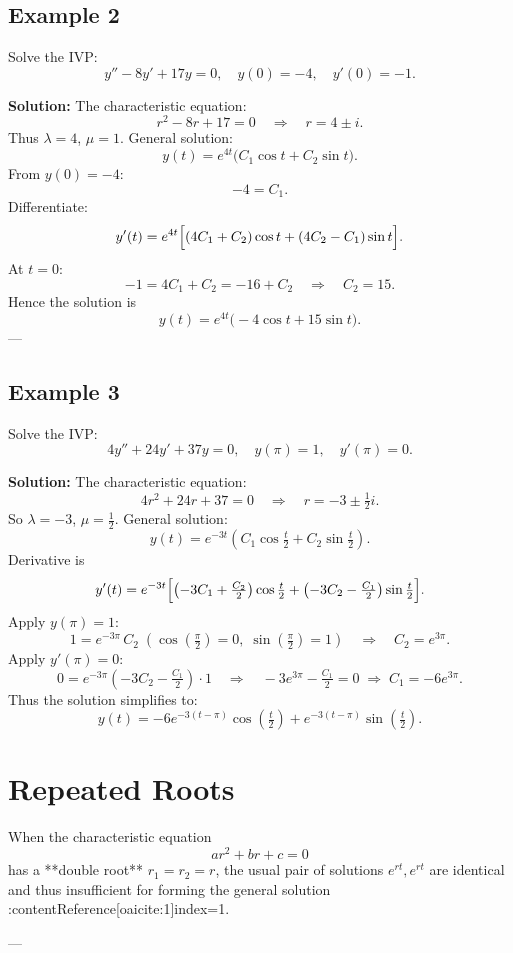 \documentclass[12pt]{book}
\begin{document}
\subsection*{Example 2}
Solve the IVP:
\[
y'' - 8y' + 17y = 0, \quad y(0) = -4, \quad y'(0) = -1.
\]

\textbf{Solution:}
The characteristic equation:
\[
r^2 - 8r + 17 = 0 \quad \Rightarrow \quad r = 4 \pm i.
\]
Thus \(\lambda=4\), \(\mu=1\). General solution:
\[
y(t) = e^{4t} \bigl(C_1 \cos t + C_2 \sin t\bigr).
\]
From \(y(0)=-4\):
\[
-4 = C_1.
\]
Differentiate:
\[
y'(t) = e^{4t} \Bigl[(4C_1 + C_2)\cos t + (4C_2 - C_1)\sin t\Bigr].
\]
At \(t=0\):
\[
-1 = 4C_1 + C_2 = -16 + C_2 \quad \Rightarrow \quad C_2 = 15.
\]
Hence the solution is
\[
\boxed{y(t) = e^{4t}\bigl(-4\cos t + 15\sin t\bigr)}.
\]
---

\subsection*{Example 3}
Solve the IVP:
\[
4y'' + 24y' + 37y = 0,\quad y(\pi) = 1,\quad y'(\pi) = 0.
\]

\textbf{Solution:}
The characteristic equation:
\[
4r^2 + 24r + 37 = 0 \quad \Rightarrow \quad r = -3 \pm \tfrac{1}{2}i.
\]
So \(\lambda = -3\), \(\mu = \frac{1}{2}\). General solution:
\[
y(t) = e^{-3t}(C_1 \cos\tfrac{t}{2} + C_2 \sin\tfrac{t}{2}).
\]
Derivative is
\[
y'(t) = e^{-3t}\Bigl[\bigl(-3C_1 + \tfrac{C_2}{2}\bigr)\cos\tfrac{t}{2} + \bigl(-3C_2 - \tfrac{C_1}{2}\bigr)\sin\tfrac{t}{2}\Bigr].
\]
Apply \(y(\pi) = 1\):
\[
1 = e^{-3\pi} \, C_2 \;(\cos(\tfrac{\pi}{2})=0,\;\sin(\tfrac{\pi}{2})=1)
\quad\Rightarrow\quad C_2 = e^{3\pi}.
\]
Apply \(y'(\pi)=0\):
\[
0 = e^{-3\pi}\left(-3C_2 - \tfrac{C_1}{2}\right)\cdot 1
\quad\Rightarrow\quad -3e^{3\pi} - \tfrac{C_1}{2} = 0 \;\Rightarrow\; C_1 = -6e^{3\pi}.
\]
Thus the solution simplifies to:
\[
\boxed{y(t) = -6e^{-3(t - \pi)}\cos\left(\tfrac{t}{2}\right) + e^{-3(t - \pi)}\sin\left(\tfrac{t}{2}\right)}.
\]

\section{Repeated Roots}

When the characteristic equation  
\[
a r^2 + b r + c = 0
\]  
has a **double root** \(r_1 = r_2 = r\), the usual pair of solutions \(e^{rt}, e^{rt}\) are identical and thus insufficient for forming the general solution :contentReference[oaicite:1]{index=1}.

---
\end{document}
